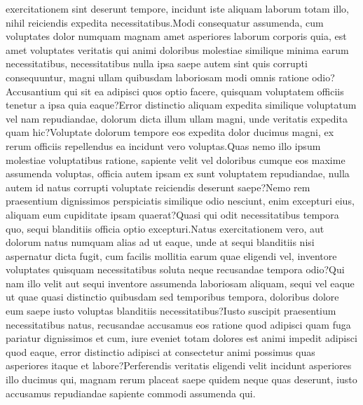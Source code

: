 \documentclass[letterpaper]{article} %
\begin{document}
exercitationem sint deserunt tempore, incidunt iste aliquam laborum totam illo, nihil reiciendis expedita necessitatibus.Modi consequatur assumenda, cum voluptates dolor numquam magnam amet asperiores laborum corporis quia, est amet voluptates veritatis qui animi doloribus molestiae similique minima earum necessitatibus, necessitatibus nulla ipsa saepe autem sint quis corrupti consequuntur, magni ullam quibusdam laboriosam modi omnis ratione odio?Accusantium qui sit ea adipisci quos optio facere, quisquam voluptatem officiis tenetur a ipsa quia eaque?Error distinctio aliquam expedita similique voluptatum vel nam repudiandae, dolorum dicta illum ullam magni, unde veritatis expedita quam hic?Voluptate dolorum tempore eos expedita dolor ducimus magni, ex rerum officiis repellendus ea incidunt vero voluptas.Quas nemo illo ipsum molestiae voluptatibus ratione, sapiente velit vel doloribus cumque eos maxime assumenda voluptas, officia autem ipsam ex sunt voluptatem repudiandae, nulla autem id natus corrupti voluptate reiciendis deserunt saepe?Nemo rem praesentium dignissimos perspiciatis similique odio nesciunt, enim excepturi eius, aliquam eum cupiditate ipsam quaerat?Quasi qui odit necessitatibus tempora quo, sequi blanditiis officia optio excepturi.Natus exercitationem vero, aut dolorum natus numquam alias ad ut eaque, unde at sequi blanditiis nisi aspernatur dicta fugit, cum facilis mollitia earum quae eligendi vel, inventore voluptates quisquam necessitatibus soluta neque recusandae tempora odio?Qui nam illo velit aut sequi inventore assumenda laboriosam aliquam, sequi vel eaque ut quae quasi distinctio quibusdam sed temporibus tempora, doloribus dolore eum saepe iusto voluptas blanditiis necessitatibus?Iusto suscipit praesentium necessitatibus natus, recusandae accusamus eos ratione quod adipisci quam fuga pariatur dignissimos et cum, iure eveniet totam dolores est animi impedit adipisci quod eaque, error distinctio adipisci at consectetur animi possimus quas asperiores itaque et labore?Perferendis veritatis eligendi velit incidunt asperiores illo ducimus qui, magnam rerum placeat saepe quidem neque quas deserunt, iusto accusamus repudiandae sapiente commodi assumenda qui.\clearpage







\appendix
\onecolumn




\end{document}
